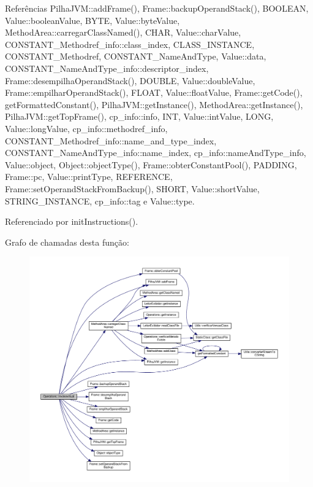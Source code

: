 Referências Pilha\+J\+V\+M\+::add\+Frame(), Frame\+::backup\+Operand\+Stack(), B\+O\+O\+L\+E\+AN, Value\+::boolean\+Value, B\+Y\+TE, Value\+::byte\+Value, Method\+Area\+::carregar\+Class\+Named(), C\+H\+AR, Value\+::char\+Value, C\+O\+N\+S\+T\+A\+N\+T\+\_\+\+Methodref\+\_\+info\+::class\+\_\+index, C\+L\+A\+S\+S\+\_\+\+I\+N\+S\+T\+A\+N\+CE, C\+O\+N\+S\+T\+A\+N\+T\+\_\+\+Methodref, C\+O\+N\+S\+T\+A\+N\+T\+\_\+\+Name\+And\+Type, Value\+::data, C\+O\+N\+S\+T\+A\+N\+T\+\_\+\+Name\+And\+Type\+\_\+info\+::descriptor\+\_\+index, Frame\+::desempilha\+Operand\+Stack(), D\+O\+U\+B\+LE, Value\+::double\+Value, Frame\+::empilhar\+Operand\+Stack(), F\+L\+O\+AT, Value\+::float\+Value, Frame\+::get\+Code(), get\+Formatted\+Constant(), Pilha\+J\+V\+M\+::get\+Instance(), Method\+Area\+::get\+Instance(), Pilha\+J\+V\+M\+::get\+Top\+Frame(), cp\+\_\+info\+::info, I\+NT, Value\+::int\+Value, L\+O\+NG, Value\+::long\+Value, cp\+\_\+info\+::methodref\+\_\+info, C\+O\+N\+S\+T\+A\+N\+T\+\_\+\+Methodref\+\_\+info\+::name\+\_\+and\+\_\+type\+\_\+index, C\+O\+N\+S\+T\+A\+N\+T\+\_\+\+Name\+And\+Type\+\_\+info\+::name\+\_\+index, cp\+\_\+info\+::name\+And\+Type\+\_\+info, Value\+::object, Object\+::object\+Type(), Frame\+::obter\+Constant\+Pool(), P\+A\+D\+D\+I\+NG, Frame\+::pc, Value\+::print\+Type, R\+E\+F\+E\+R\+E\+N\+CE, Frame\+::set\+Operand\+Stack\+From\+Backup(), S\+H\+O\+RT, Value\+::short\+Value, S\+T\+R\+I\+N\+G\+\_\+\+I\+N\+S\+T\+A\+N\+CE, cp\+\_\+info\+::tag e Value\+::type.



Referenciado por init\+Instructions().

Grafo de chamadas desta função\+:
\nopagebreak
\begin{figure}[H]
\begin{center}
\leavevmode
\includegraphics[width=350pt]{classOperations_acf53d7e184b8828702b4d5036ef0a7a9_cgraph}
\end{center}
\end{figure}
\mbox{\label{classOperations_aaa890c310bc7a93e97b2c5004df94e70}} 
